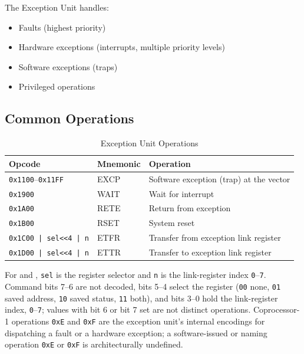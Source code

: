 The Exception Unit handles:
\begin{itemize}
	\item Faults (highest priority)
	\item Hardware exceptions (interrupts, multiple priority levels)
	\item Software exceptions (traps)
	\item Privileged operations
\end{itemize}

\subsection{Common Operations}

\begin{table}[H]
	\centering
	\begin{tabular}{llp{8cm}}
		\toprule
		\textbf{Opcode}                  & \textbf{Mnemonic} & \textbf{Operation}                      \\
		\midrule
		\texttt{0x1100}--\texttt{0x11FF} & EXCP              & Software exception (trap) at the vector \\
		\texttt{0x1900}                  & WAIT              & Wait for interrupt                      \\
		\texttt{0x1A00}                  & RETE              & Return from exception                   \\
		\texttt{0x1B00}                  & RSET              & System reset                            \\
		\texttt{0x1C00 | sel<<4 | n}     & ETFR              & Transfer from exception link register   \\
		\texttt{0x1D00 | sel<<4 | n}     & ETTR              & Transfer to exception link register     \\
		\bottomrule
	\end{tabular}
	\caption{Exception Unit Operations}
\end{table}

\noindent For  and , \texttt{sel} is the register selector and \texttt{n} is the link-register
index \texttt{0}--\texttt{7}. Command bits 7--6 are not decoded, bits 5--4 select the register
(\texttt{00} none, \texttt{01} saved address, \texttt{10} saved status, \texttt{11} both), and bits 3--0 hold the
link-register index, \texttt{0}--\texttt{7}; values with bit 6 or bit 7 set are not distinct operations. Coprocessor-1
operations \texttt{0xE} and \texttt{0xF} are the exception unit's internal encodings for dispatching a fault or a
hardware exception; a software-issued  or  naming operation \texttt{0xE} or \texttt{0xF}
is architecturally undefined.

